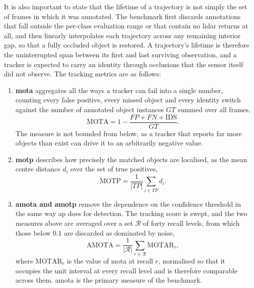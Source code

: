 It is also important to state that the lifetime of a trajectory is not simply the set of frames in which it was
annotated. The benchmark first discards annotations that fall outside the
per-class evaluation range or that contain no \acs{lidar} returns at all, and
then linearly interpolates each trajectory across any remaining interior gap,
so that a fully occluded object is restored. A trajectory's lifetime is therefore the uninterrupted span between
its first and last surviving observation, and a tracker is expected to carry
an identity through occlusions that the sensor itself did not observe. The tracking metrics are as follows:

\begin{enumerate}
    \item \textbf{\Acf{mota}} aggregates all the ways a tracker can fail into a single number, counting
    every false positive, every missed object and every identity switch against the number of annotated
    object instances \(GT\) summed over all frames,
    \begin{equation}
        \mathrm{MOTA} = 1 - \frac{FP + FN + \mathrm{IDS}}{GT}.
        \label{eq:mota}
    \end{equation}
    The measure is not bounded from below, as a tracker that reports far more objects than exist can drive
    it to an arbitrarily negative value.

    \item \textbf{\Acf{motp}} describes how precisely the matched objects are localised, as the mean centre
    distance \(d_i\) over the set of true positives,
    \begin{equation}
        \mathrm{MOTP} = \frac{1}{|TP|} \sum_{i \in TP} d_i .
        \label{eq:motp}
    \end{equation}

    \item \textbf{\Acf{amota} and \acf{amotp}} remove the dependence on the confidence threshold in the same
    way \acs{ap} does for detection. The tracking score is swept, and the two measures above are averaged
    over a set \(\mathcal{R}\) of forty recall levels, from which those below \(0.1\) are discarded as
    dominated by noise,
    \begin{equation}
        \mathrm{AMOTA} = \frac{1}{|\mathcal{R}|} \sum_{r \in \mathcal{R}} \mathrm{MOTAR}_r ,
        \label{eq:amota}
    \end{equation}
    where \(\mathrm{MOTAR}_r\) is the value of \acs{mota} at recall \(r\), normalised so that it occupies
    the unit interval at every recall level and is therefore comparable across them. \Acs{amota} is the
    primary measure of the benchmark.


\end{enumerate}

